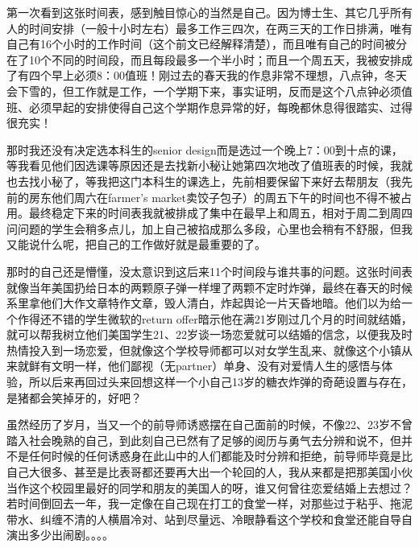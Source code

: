 \documentclass[12pt]{book}
\begin{document}
第一次看到这张时间表，感到触目惊心的当然是自己。因为博士生、其它几乎所有人的时间安排（一般十小时左右）最多工作三四次，在两三天的工作日排满，唯有自己有16个小时的工作时间（这个前文已经解释清楚），而且唯有自己的时间被分在了10个不同的时间段，而且每段最多一个半小时；而且一个周五天，我被安排成了有四个早上必须8：00值班！刚过去的春天我的作息非常不理想，八点钟，冬天会下雪的，但工作就是工作，一个学期下来，事实证明，反而是这个八点钟必须值班、必须早起的安排使得自己这个学期作息异常的好，每晚都休息得很踏实、过得很充实！

那时我还没有决定选本科生的senior design而是选过一个晚上7：00到十点的课，等我看见他们因选课等原因还是去找新小秘让她第四次地改了值班表的时候，我就也去找小秘了，等我把这门本科生的课选上，先前相要保留下来好去帮朋友（我先前的房东他们周六在farmer's market卖饺子包子）的周五下午的时间也不得不被占用。最终稳定下来的时间表我就被排成了集中在最早上和周五，相对于周二到周四问问题的学生会稍多点儿，加上自己被掐成那么多段，心里也会稍有不舒服，但我又能说什么呢，把自己的工作做好就是最重要的了。

那时的自己还是懵懂，没太意识到这后来11个时间段与谁共事的问题。这张时间表就像当年美国扔给日本的两颗原子弹一样埋了两颗不定时炸弹，最终在春天的时候系里拿他们大作文章特作文章，毁人清白，炸起舆论一片天昏地暗。他们以为给一个作得还不错的学生微软的return offer暗示他在满21岁刚过几个月的时间就结婚，就可以帮我树立他们美国学生21、22岁谈一场恋爱就可以结婚的信念，以便我及时热情投入到一场恋爱，但就像这个学校导师都可以对女学生乱来、就像这个小镇从来就鲜有文明一样，他们鄙视（无partner）单身、没有对爱情人生的感悟与体验，所以后来再回过头来回想这样一个小自己13岁的糖衣炸弹的奇葩设置与存在，是猪都会笑掉牙的，好吧？

虽然经历了岁月，当又一个的前导师诱惑摆在自己面前的时候，不像22、23岁不曾踏入社会晚熟的自己，到此刻自己已然有了足够的阅历与勇气去分辨和说不，但并不是任何时候的任何诱惑身在此山中的人们都能及时分辨和拒绝，前导师毕竟是比自己大很多、甚至是比表哥都还要再大出一个轮回的人，我从来都是把那美国小伙当作这个校园里最好的同学和朋友的美国人的呀，谁又何曾往恋爱结婚上去想过？若时间倒回去一年，我一定像在自己现在打工的食堂一样，对那些过于粘乎、拖泥带水、纠缠不清的人横眉冷对、站到尽量远、冷眼静看这个学校和食堂还能自导自演出多少出闹剧。。。。
\end{document}
